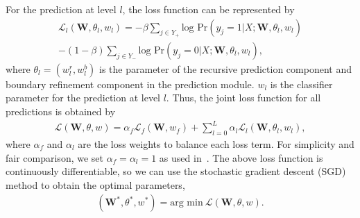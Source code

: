 \documentclass[10pt,twocolumn,letterpaper]{article}
\begin{document}
For the prediction at level $l$, the loss function can be represented by
\begin{equation}
  \label{equ:equ5}
\begin{aligned}
  \mathcal{L}_l(\textbf{W},\theta_l,w_l)= - \beta \sum_{j\in Y_{+}} \text{log~Pr}(y_{j}=1|X;\textbf{W},\theta_l,w_l)\\
  -(1-\beta)\sum_{j\in Y_{-}} \text{log~Pr}(y_{j}=0|X;\textbf{W},\theta_l,w_l),
\end{aligned}
\end{equation}
where $\theta_l = (w^r_l,w^{b}_l)$ is the parameter of the recursive prediction component and boundary refinement component in the prediction module.
$w_l$ is the classifier parameter for the prediction at level $l$.
Thus, the joint loss function for all predictions is obtained by
\begin{align}
  \mathcal{L}(\textbf{W},\theta,w)= \alpha_f \mathcal{L}_f(\textbf{W},w_f)
  +\sum_{l=0}^{L}\alpha_l\mathcal{L}_l(\textbf{W},\theta_l,w_l),
  \label{equ:equ6}
\end{align}
where $\alpha_f$ and $\alpha_l$ are the loss weights to balance each loss term. For simplicity and fair comparison, we set $\alpha_f=\alpha_l=1$ as used in~\cite{xie2015holistically}.
The above loss function is continuously differentiable, so we can use the stochastic gradient descent (SGD) method to obtain the optimal parameters,
\begin{align}
(\textbf{W}^{*},\theta^{*},w^{*})= \text{arg min}~\mathcal{L}(\textbf{W},\theta,w).
  \label{equ:equ7}
\end{align}
\end{document}
